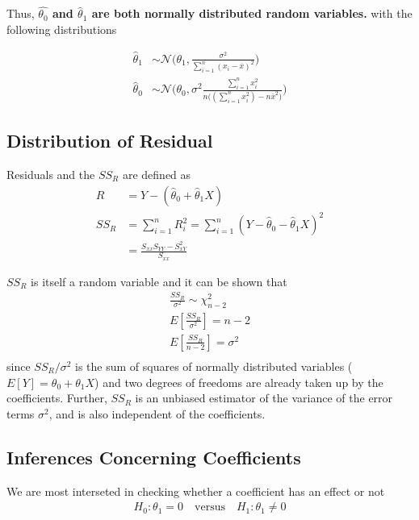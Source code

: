 \documentclass[../probability-notes.tex]{subfiles}
\begin{document}
    Thus, \textbf{$\hat{\theta_{0}}$ and $\hat{\theta}_{1}$ are both normally distributed random variables.} with the following distributions

    \begin{align*}
        \hat{\theta}_{1} &\sim \mathcal{N}\bigg(\theta_{1}, \frac{\sigma^{2}}{\sum_{i=1}^{n}(x_{i} - \overline{x})^{2}} \bigg)\\
        \hat{\theta}_{0} &\sim \mathcal{N}\bigg(\theta_{0}, \sigma^{2} \frac{\sum_{i=1}^{n} x_{i}^{2}}{n\big((\sum_{i=1}^{n} x_{i}^{2}) - n\bar{x}^{2} \big)} \bigg)
    \end{align*}


    \subsection{Distribution of Residual}
    Residuals and the $SS_{R}$ are defined as
    \begin{align*}
        R &= Y - (\hat{\theta}_{0} + \hat{\theta}_{1}X)\\
        SS_{R} &= \sum_{i=1}^{n} R_{i}^{2} = \sum_{i=1}^{n} (Y - \hat{\theta}_{0} - \hat{\theta}_{1}X)^{2}\\
        &= \frac{S_{xx}S_{YY} - S_{xY}^{2}}{S_{xx}}
    \end{align*}

    $SS_{R}$ is itself a random variable and it can be shown that
    \begin{align*}
        \frac{SS_{R}}{\sigma^{2}} \sim \chi_{n-2}^{2}\\
        E[\frac{SS_{R}}{\sigma^{2}}] = n - 2\\
        E[\frac{SS_{R}}{n-2}] = \sigma^{2}\\
    \end{align*}
    since $SS_{R}/\sigma^{2}$ is the sum of squares of normally distributed variables ($E[Y] = \theta_{0} + \theta_{1}X$) and two degrees of freedoms are already taken up by the coefficients. Further, $SS_{R}$ is an unbiased estimator of the variance of the error terms $\sigma^{2}$, and is also independent of the coefficients.

    \subsection{Inferences Concerning Coefficients}
    We are most interseted in checking whether a coefficient has an effect or not
    \begin{align*}
        H_{0}: \theta_{1} = 0 \quad \text{versus} \quad H_{1}: \theta_{1} \neq 0
    \end{align*}
\end{document}
